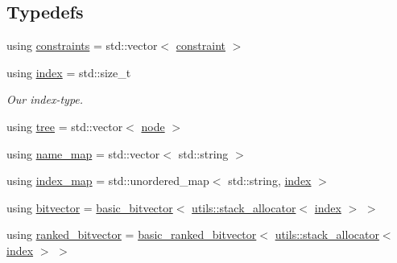 \subsection*{Typedefs}
\begin{DoxyCompactItemize}
\item 
using \hyperlink{namespaceterraces_a6f603ffd30ed4d902fce6424492e0581}{constraints} = std\+::vector$<$ \hyperlink{structterraces_1_1constraint}{constraint} $>$
\item 
using \hyperlink{namespaceterraces_adbc33ccb543d1634e96d0eb02e472c77}{index} = std\+::size\+\_\+t
\begin{DoxyCompactList}\small\item\em Our index-\/type. \end{DoxyCompactList}\item 
using \hyperlink{namespaceterraces_a07aaf7feec4a22c6cdefc14c5a81bdd0}{tree} = std\+::vector$<$ \hyperlink{structterraces_1_1node}{node} $>$
\item 
using \hyperlink{namespaceterraces_a4ef0217fe5aed881737d9bc5a8d45dca}{name\+\_\+map} = std\+::vector$<$ std\+::string $>$
\item 
using \hyperlink{namespaceterraces_a148f3e895119c2a72d995caae669e40d}{index\+\_\+map} = std\+::unordered\+\_\+map$<$ std\+::string, \hyperlink{namespaceterraces_adbc33ccb543d1634e96d0eb02e472c77}{index} $>$
\item 
using \hyperlink{namespaceterraces_a1b526fb554dff829f7ad51eb21d5ed06}{bitvector} = \hyperlink{classterraces_1_1basic__bitvector}{basic\+\_\+bitvector}$<$ \hyperlink{classterraces_1_1utils_1_1stack__allocator}{utils\+::stack\+\_\+allocator}$<$ \hyperlink{namespaceterraces_adbc33ccb543d1634e96d0eb02e472c77}{index} $>$ $>$
\item 
using \hyperlink{namespaceterraces_acc45ec9c561024c50ecbce5b6738ba08}{ranked\+\_\+bitvector} = \hyperlink{classterraces_1_1basic__ranked__bitvector}{basic\+\_\+ranked\+\_\+bitvector}$<$ \hyperlink{classterraces_1_1utils_1_1stack__allocator}{utils\+::stack\+\_\+allocator}$<$ \hyperlink{namespaceterraces_adbc33ccb543d1634e96d0eb02e472c77}{index} $>$ $>$
\end{DoxyCompactItemize}
